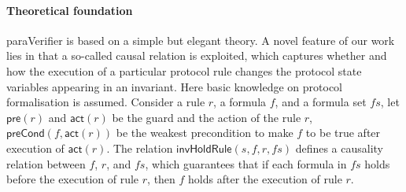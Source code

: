 \documentclass{llncs-new}
\begin{document}
\vspace{-15pt}

\paragraph{Theoretical foundation}  {\sf paraVerifier} is based on a simple but elegant theory.  %
A novel feature of our work lies in that a so-called causal
relation is exploited, which captures whether and how the execution of a particular protocol rule changes the protocol state variables appearing in an invariant. Here  basic knowledge on protocol formalisation is assumed. Consider a rule $r$, a formula $f$, and a formula set $fs$, let $\mathsf{pre}(r)$ and $\mathsf{act}( r)$ be the guard and the action of the rule $r$, $\mathsf{preCond}( f,\mathsf{act}( r))$ be the weakest precondition to make $f$ to be true after execution of $\mathsf{act}( r)$. %
The relation $\mathsf{invHoldRule}(s, f,r,fs)$ defines a causality relation
between $f$, $r$, and $fs$, which guarantees that if each formula in $fs$ holds
before the execution of rule $r$, then $f$ holds after the execution of rule $r$.
\end{document}
